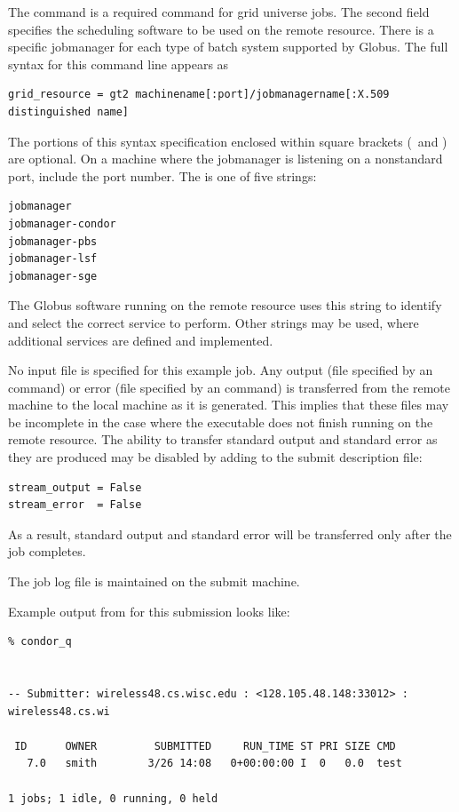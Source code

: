 The command  is a required command
for grid universe jobs.
The second field specifies the scheduling software
to be used on the remote resource.
There is a specific jobmanager for each type of
batch system supported by Globus.
The full syntax for this command line appears as
\footnotesize
\begin{verbatim}
grid_resource = gt2 machinename[:port]/jobmanagername[:X.509 distinguished name]
\end{verbatim}
\normalsize
The portions of this syntax specification enclosed within
square brackets (\Lbr\ and \Rbr) are optional.
On a machine where the jobmanager is listening on a nonstandard port,
include the port number.
The \verb@jobmanagername@
is one of five strings:
\begin{verbatim}
jobmanager
jobmanager-condor
jobmanager-pbs
jobmanager-lsf
jobmanager-sge
\end{verbatim}
The Globus software running on the remote resource
uses this string to identify and select the correct service
to perform.
Other \verb@jobmanagername@ strings may be used,
where additional services are defined and implemented.


No input file is specified for this example job.
Any output (file specified by an  command)
or error (file specified by an  command)
is transferred 
from the remote machine to the local machine as it is generated.
This implies that these files may be incomplete in the case
where the executable does not finish running on the remote resource.
The ability to transfer standard output and standard error as
they are produced may be disabled by adding to the submit
description file:
\begin{verbatim}
stream_output = False
stream_error  = False
\end{verbatim}
As a result, standard output and standard error will be transferred
only after the job completes.

The job log file is maintained on the submit machine.

Example output from 
 for this submission looks like:
\footnotesize
\begin{verbatim}
% condor_q


-- Submitter: wireless48.cs.wisc.edu : <128.105.48.148:33012> : wireless48.cs.wi

 ID      OWNER         SUBMITTED     RUN_TIME ST PRI SIZE CMD
   7.0   smith        3/26 14:08   0+00:00:00 I  0   0.0  test

1 jobs; 1 idle, 0 running, 0 held
\end{verbatim}
\normalsize

